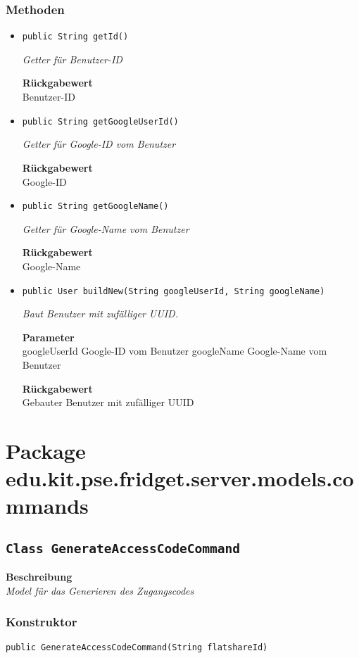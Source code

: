     \subsubsection{Methoden}
    \begin{itemize}
    	\item{\texttt{public String getId()}}
    	
    	\textit{Getter für Benutzer-ID}
    	
    	
    	
    	\textbf{Rückgabewert} \\
    	Benutzer-ID        \item{\texttt{public String getGoogleUserId()}}
    	
    	\textit{Getter für Google-ID vom Benutzer}
    	
    	
    	
    	\textbf{Rückgabewert} \\
    	Google-ID        \item{\texttt{public String getGoogleName()}}
    	
    	\textit{Getter für Google-Name vom Benutzer}
    	
    	
    	
    	\textbf{Rückgabewert} \\
    	Google-Name        \item{\texttt{public User buildNew(String googleUserId, String googleName)}}
    	
    	\textit{Baut Benutzer mit zufälliger UUID.}
    	
    	\textbf{Parameter} \\
    	googleUserId Google-ID vom Benutzer
    	googleName Google-Name vom Benutzer
    	
    	\textbf{Rückgabewert} \\
    	Gebauter Benutzer mit zufälliger UUID
    \end{itemize}
    \section{Package edu.kit.pse.fridget.server.models.commands}
    \subsection{\texttt{Class GenerateAccessCodeCommand}}
    \textbf{Beschreibung} \\
    \textit{Model für das Generieren des Zugangscodes}
    \subsubsection{Konstruktor}
    \texttt{public GenerateAccessCodeCommand(String flatshareId)}
